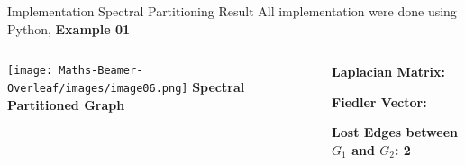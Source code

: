 \documentclass[aspectratio=169]{beamer}
\begin{document}
\begin{frame}{{Implementation Spectral Partitioning Result}}
All implementation were done using Python,
\textbf{Example 01}
\begin{columns}

\begin{column}{0.45\textwidth}
    \centering
    \texttt{[image: Maths-Beamer-Overleaf/images/image06.png]}
    \vspace{1mm}
    \textbf{Spectral Partitioned Graph}
\end{column}

\begin{column}{0.48\textwidth}
    \scriptsize
    \textbf{Laplacian Matrix:}
    
    \vspace{1mm}

    \vspace{2mm}
    \textbf{Fiedler Vector:}
    
    \vspace{1mm}

    \vspace{2mm}
    \textbf{Lost Edges between \(G_1\) and \(G_2\): 2}

\end{column}
\end{columns}
\end{frame}
\end{document}
